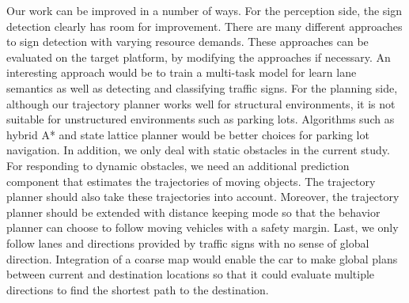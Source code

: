 Our work can be improved in a number of ways. For the perception side, the sign
detection clearly has room for improvement. There are many different approaches
to sign detection with varying resource demands. These approaches can be
evaluated on the target platform, by modifying the approaches if necessary. An
interesting approach would be to train a multi-task model for learn lane
semantics as well as detecting and classifying traffic signs. For the planning
side, although our trajectory planner works well for structural environments,
it is not suitable for unstructured environments such as parking lots.
Algorithms such as hybrid A* and state lattice planner would be better choices
for parking lot navigation. In addition, we only deal with static obstacles in
the current study. For responding to dynamic obstacles, we need an additional
prediction component that estimates the trajectories of moving objects. The
trajectory planner should also take these trajectories into account. Moreover,
the trajectory planner should be extended with distance keeping mode so that
the behavior planner can choose to follow moving vehicles with a safety margin.
Last, we only follow lanes and directions provided by traffic signs with no
sense of global direction. Integration of a coarse map would enable the car
to make global plans between current and destination locations so that it could
evaluate multiple directions to find the shortest path to the destination.
